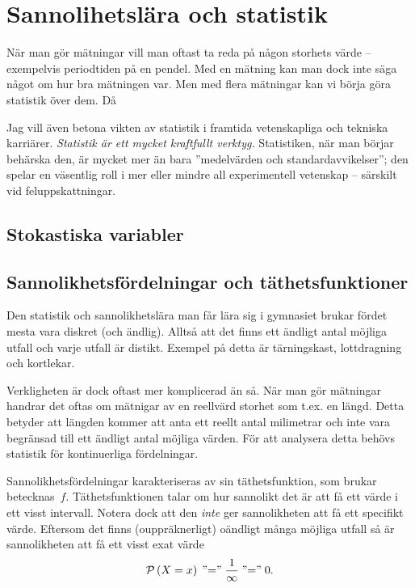 \documentclass[11pt,a4paper, english, swedish
]{article}
\newcommand{\PP}[1]{\ensuremath\mathcal{P}\left(#1\right)}
\begin{document}
\section{Sannolihetslära och statistik}\label{sec:statistik}
När man gör mätningar vill man oftast ta reda på någon storhets värde
-- exempelvis periodtiden på en pendel. Med en mätning kan man dock
inte säga något om hur bra mätningen var. Men med flera mätningar kan
vi börja göra statistik över dem. Då 

Jag vill även betona vikten av statistik i framtida vetenskapliga och
tekniska karriärer. \emph{Statistik är ett mycket kraftfullt verktyg.}
Statistiken, när man börjar behärska den, är mycket mer än bara
''medelvärden och standardavvikelser''; den spelar en väsentlig roll i
mer eller mindre all experimentell vetenskap -- särskilt vid
feluppskattningar. 

\subsection{Stokastiska variabler}

\subsection{Sannolikhetsfördelningar och täthetsfunktioner}
Den statistik och sannolikhetslära man får lära sig i gymnasiet brukar
fördet mesta vara diskret (och ändlig). Alltså att det finns ett
ändligt antal möjliga utfall och varje utfall är distikt. Exempel på
detta är tärningskast, lottdragning och kortlekar. 

Verkligheten är dock oftast mer komplicerad än så. När man gör
mätningar handrar det oftas om mätnigar av en reellvärd
storhet som t.ex. en längd\footnotemark{}. Detta betyder att längden
kommer att anta ett reellt antal milimetrar och inte vara begränsad
till ett ändligt antal möjliga värden. För att analysera detta behövs
statistik för kontinuerliga fördelningar. 

Sannolikhetsfördelningar karakteriseras av sin täthetsfunktion, som
brukar betecknas~$f$. Täthetsfunktionen talar om hur sannolikt det är
att få ett värde i ett visst intervall. Notera dock att den
\emph{inte} ger sannolikheten att få ett specifikt värde. Eftersom
det finns (ouppräknerligt) oändligt många möjliga utfall så är
sannolikheten att få ett visst exat värde
\begin{equation}
\PP{X=x}\; \text{''=''}\; \frac{1}{\infty}\; \text{''=''}\;0.
\end{equation}
\end{document}
